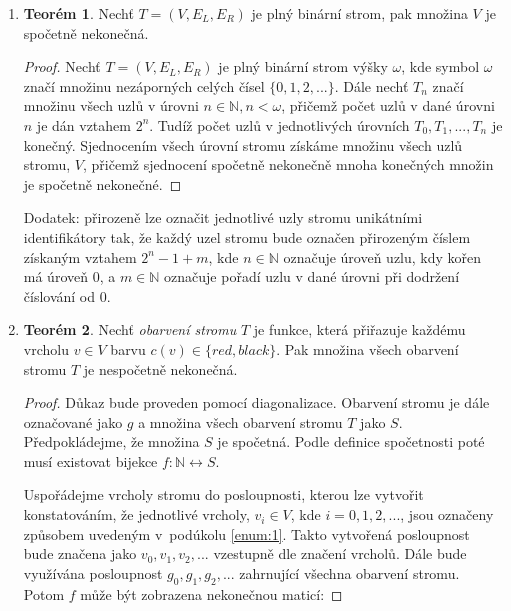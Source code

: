 \documentclass[a4paper, 12pt]{article}
\theoremstyle{definition}
\theoremstyle{definition}
\newtheorem{theorem}{Teorém}[section]
\theoremstyle{definition}
\theoremstyle{remark}
\begin{document}
\begin{enumerate}[label=(\alph*)]    
    \item \label{enum:1}

    \begin{theorem}
        Nechť $T = (V, E_L, E_R)$ je plný binární strom, pak množina $V$ je spočetně nekonečná.
    \end{theorem}
    \begin{proof}
        Nechť $T = (V, E_L, E_R)$ je plný binární strom výšky $\omega$, kde symbol $\omega$ značí množinu nezáporných celých čísel $\{0, 1, 2, ...\}$. Dále nechť $T_n$ značí množinu všech uzlů v úrovni $n \in \mathbb{N}, n < \omega$, přičemž počet uzlů v dané úrovni $n$ je dán vztahem $2^n$. Tudíž počet uzlů v jednotlivých úrovních $T_0, T_1, ..., T_n$ je konečný. Sjednocením všech úrovní stromu získáme množinu všech uzlů stromu, $V$, přičemž sjednocení spočetně nekonečně mnoha konečných množin je spočetně nekonečné.
    \end{proof}

    Dodatek: přirozeně lze označit jednotlivé uzly stromu unikátními identifikátory tak, že každý uzel stromu bude označen přirozeným číslem získaným vztahem $2^n - 1 + m$, kde $n \in \mathbb{N}$ označuje úroveň uzlu, kdy kořen má úroveň $0$, a $m \in \mathbb{N}$ označuje pořadí uzlu v dané úrovni při dodržení číslování od $0$.

    \item

    \begin{theorem}
        Nechť \textit{obarvení stromu} $T$ je funkce, která přiřazuje každému vrcholu $v \in V$ barvu $c(v) \in \{red, black\}$. Pak množina všech obarvení stromu $T$ je nespočetně nekonečná.
    \end{theorem}
    \begin{proof}
        Důkaz bude proveden pomocí diagonalizace. Obarvení stromu je dále označované jako $g$ a množina všech obarvení stromu $T$ jako $S$. Předpokládejme, že množina $S$ je spočetná. Podle definice spočetnosti poté musí existovat bijekce $f: \mathbb{N} \longleftrightarrow S$.
        
        Uspořádejme vrcholy stromu do posloupnosti, kterou lze vytvořit konstatováním, že jednotlivé vrcholy, $v_i \in V$, kde $i = 0, 1, 2, ...$, jsou označeny způsobem uvedeným v~podúkolu \ref{enum:1}. Takto vytvořená posloupnost bude značena jako $v_0, v_1, v_2, ...$ vzestupně dle značení vrcholů. Dále bude využívána posloupnost $g_0, g_1, g_2, ...$ zahrnující všechna obarvení stromu. Potom $f$ může být zobrazena nekonečnou maticí:


\end{proof}
\end{enumerate}
\end{document}
